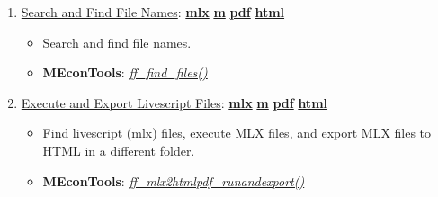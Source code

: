 \documentclass[
]{book}
\providecommand{\tightlist}{%
  \setlength{\itemsep}{0pt}\setlength{\parskip}{0pt}}
\begin{document}
\begin{enumerate}
\def\labelenumi{\arabic{enumi}.}
\tightlist
\item
  \href{https://fanwangecon.github.io/MEconTools/MEconTools/doc/sys/htmlpdfm/fx_find_files.html}{Search and Find File Names}: \href{https://github.com/FanWangEcon/MEconTools/blob/master/MEconTools/doc/sys/fx_find_files.mlx}{\textbf{mlx}} \textbar{} \href{https://github.com/FanWangEcon/MEconTools/blob/master/MEconTools/doc/sys/htmlpdfm/fx_find_files.m}{\textbf{m}} \textbar{} \href{https://github.com/FanWangEcon/MEconTools/blob/master/MEconTools/doc/sys/htmlpdfm/fx_find_files.pdf}{\textbf{pdf}} \textbar{} \href{https://fanwangecon.github.io/MEconTools/MEconTools/doc/sys/htmlpdfm/fx_find_files.html}{\textbf{html}}

  \begin{itemize}
  \tightlist
  \item
    Search and find file names.
  \item
    \textbf{MEconTools}: \emph{\href{https://github.com/FanWangEcon/MEconTools/blob/master/MEconTools/sys/ff_find_files.m}{ff\_find\_files()}}
  \end{itemize}
\item
  \href{https://fanwangecon.github.io/MEconTools/MEconTools/doc/sys/htmlpdfm/fx_mlx2htmlpdf_runandexport.html}{Execute and Export Livescript Files}: \href{https://github.com/FanWangEcon/MEconTools/blob/master/MEconTools/doc/sys/fx_mlx2htmlpdf_runandexport.mlx}{\textbf{mlx}} \textbar{} \href{https://github.com/FanWangEcon/MEconTools/blob/master/MEconTools/doc/sys/htmlpdfm/fx_mlx2htmlpdf_runandexport.m}{\textbf{m}} \textbar{} \href{https://github.com/FanWangEcon/MEconTools/blob/master/MEconTools/doc/sys/htmlpdfm/fx_mlx2htmlpdf_runandexport.pdf}{\textbf{pdf}} \textbar{} \href{https://fanwangecon.github.io/MEconTools/MEconTools/doc/sys/htmlpdfm/fx_mlx2htmlpdf_runandexport.html}{\textbf{html}}

  \begin{itemize}
  \tightlist
  \item
    Find livescript (mlx) files, execute MLX files, and export MLX files to HTML in a different folder.
  \item
    \textbf{MEconTools}: \emph{\href{https://github.com/FanWangEcon/MEconTools/blob/master/MEconTools/sys/ff_mlx2htmlpdf_runandexport.m}{ff\_mlx2htmlpdf\_runandexport()}}
  \end{itemize}
\end{enumerate}

  
\end{document}
